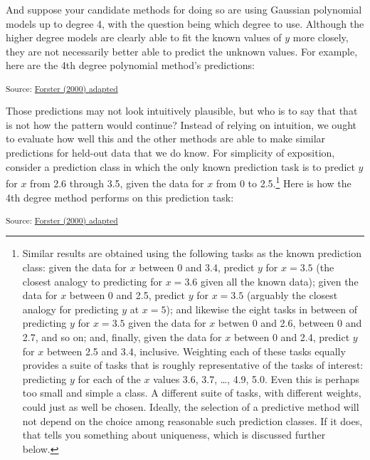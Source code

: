 \documentclass[
  letterpaper,
  DIV=11,
  numbers=noendperiod]{scrartcl}
\theoremstyle{definition}
\theoremstyle{remark}
\begin{document}
And suppose your candidate methods for doing so are using Gaussian
polynomial models up to degree 4, with the question being which degree
to use. Although the higher degree models are clearly able to fit the
known values of \(y\) more closely, they are not necessarily better able
to predict the unknown values. For example, here are the 4th degree
polynomial method's predictions:

\textsubscript{Source:
\href{https://hugetim.github.io/justify-predictive/notebooks/forster2000_adapted-preview.html\#cell-fig-poly4-predict}{Forster
(2000) adapted}}

Those predictions may not look intuitively plausible, but who is to say
that that is not how the pattern would continue? Instead of relying on
intuition, we ought to evaluate how well this and the other methods are
able to make similar predictions for held-out data that we do know. For
simplicity of exposition, consider a prediction class in which the only
known prediction task is to predict \(y\) for \(x\) from 2.6 through
3.5, given the data for \(x\) from 0 to 2.5.\footnote{Similar results
  are obtained using the following tasks as the known prediction class:
  given the data for \(x\) between 0 and 3.4, predict \(y\) for
  \(x=3.5\) (the closest analogy to predicting for \(x=3.6\) given all
  the known data); given the data for \(x\) between 0 and 2.5, predict
  \(y\) for \(x=3.5\) (arguably the closest analogy for predicting \(y\)
  at \(x=5\)); and likewise the eight tasks in between of predicting
  \(y\) for \(x=3.5\) given the data for \(x\) betwen 0 and 2.6, between
  0 and 2.7, and so on; and, finally, given the data for \(x\) between 0
  and 2.4, predict \(y\) for \(x\) between 2.5 and 3.4, inclusive.
  Weighting each of these tasks equally provides a suite of tasks that
  is roughly representative of the tasks of interest: predicting \(y\)
  for each of the \(x\) values 3.6, 3.7, \ldots, 4.9, 5.0. Even this is
  perhaps too small and simple a class. A different suite of tasks, with
  different weights, could just as well be chosen. Ideally, the
  selection of a predictive method will not depend on the choice among
  reasonable such prediction classes. If it does, that tells you
  something about uniqueness, which is discussed further below.} Here is
how the 4th degree method performs on this prediction task:

\textsubscript{Source:
\href{https://hugetim.github.io/justify-predictive/notebooks/forster2000_adapted-preview.html\#cell-fig-poly4-eval}{Forster
(2000) adapted}}
\end{document}

